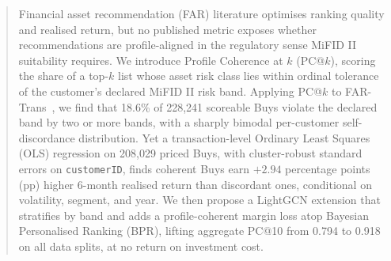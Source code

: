 \begin{abstract}
Financial asset recommendation (FAR) literature optimises ranking quality and realised return, but no published metric exposes whether recommendations are profile-aligned in the regulatory sense MiFID II suitability requires. We introduce Profile Coherence at $k$ (PC@$k$), scoring the share of a top-$k$ list whose asset risk class lies within ordinal tolerance of the customer's declared MiFID II risk band. Applying PC@$k$ to FAR-Trans~\cite{sanzcruzado:fartrans}, we find that 18.6\% of 228{,}241 scoreable Buys violate the declared band by two or more bands, with a sharply bimodal per-customer self-discordance distribution. Yet a transaction-level Ordinary Least Squares (OLS) regression on 208{,}029 priced Buys, with cluster-robust standard errors on \texttt{customerID}, finds coherent Buys earn $+2.94$ percentage points (pp) higher 6-month realised return than discordant ones, conditional on volatility, segment, and year. We then propose a LightGCN extension that stratifies by band and adds a profile-coherent margin loss atop Bayesian Personalised Ranking (BPR), lifting aggregate PC@10 from 0.794 to 0.918 on all data splits, at no return on investment cost.
\end{abstract}
